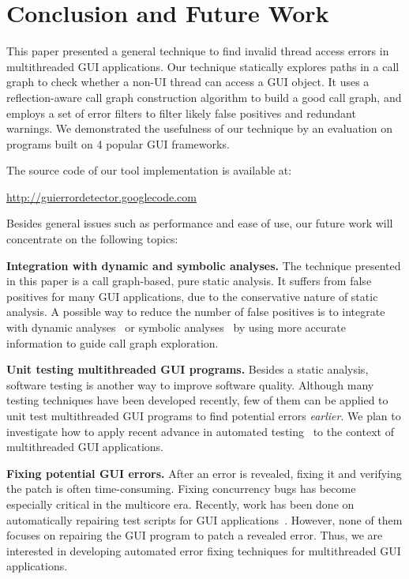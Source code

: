 \smallstep
\section{Conclusion and Future Work}

This paper presented a general technique to find invalid
thread access errors in multithreaded GUI applications. 
Our technique statically explores paths in a call graph to check
whether a non-UI thread can access a GUI object.
It uses a reflection-aware call graph construction algorithm
to build a good call graph, and employs a set of error
filters to filter likely false positives and redundant warnings.
We demonstrated the usefulness of our technique
by an evaluation on \subnum programs built on 4 popular GUI
frameworks. 

The source code of our tool implementation is available at:


\noindent \url{http://guierrordetector.googlecode.com}


\vspace{1mm}


Besides general issues such as performance and ease of use, our future
work will concentrate on the following topics:

\textbf{Integration with dynamic and symbolic analyses.} The technique 
presented in this paper is a call graph-based, pure static analysis. 
It suffers from false positives for many GUI applications,
due to the conservative nature of static analysis.
A possible way to reduce the number of false
positives is to integrate with
dynamic analyses~\cite{ZhangSBE2011}
or symbolic analyses~\cite{xie05:symstra, Pasareanu:2011}
by using more accurate information to guide call graph exploration.

\textbf{Unit testing multithreaded GUI programs.} Besides
a static analysis,  software testing is another
way to improve software quality.  Although many
testing techniques have been developed recently, few of them can be applied
to unit test multithreaded GUI programs to find potential errors \textit{earlier}. We
plan to investigate how to apply recent advance in automated
testing~\cite{ZhangSBE2011, Jagannath:2011:IMU:2025113.2025145}
to the context of multithreaded GUI applications.


\textbf{Fixing potential GUI errors.} After an error is revealed, fixing
it and verifying the patch is often time-consuming. Fixing concurrency
bugs has become especially critical in the multicore era.
Recently, work has been done
on automatically repairing test scripts for GUI applications~\cite{Daniel:2011:AGR:2002931.2002937, Huang:2010:RGT:1828417.1828465}. However, none of them focuses on repairing
the GUI program to patch a revealed error. Thus, we are interested in 
developing automated error fixing techniques for
multithreaded GUI applications.

